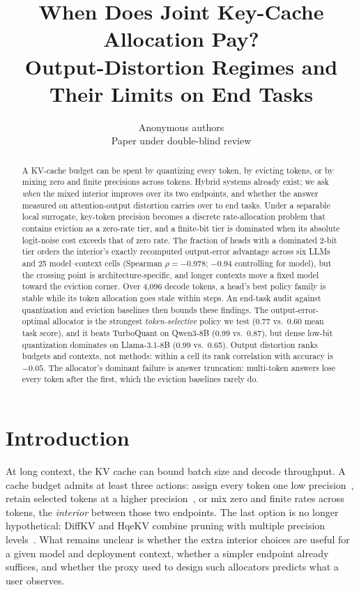 \documentclass{article}
\title{When Does Joint Key-Cache Allocation Pay?\\
Output-Distortion Regimes and Their Limits on End Tasks}
\author{Anonymous authors \\ Paper under double-blind review}
\theoremstyle{definition}
\begin{document}
\maketitle

\begin{abstract}
A KV-cache budget can be spent by quantizing every token, by evicting tokens, or by mixing zero and finite precisions across tokens.  Hybrid systems already exist; we ask \emph{when} the mixed interior improves over its two endpoints, and whether the answer measured on attention-output distortion carries over to end tasks.  Under a separable local surrogate, key-token precision becomes a discrete rate-allocation problem that contains eviction as a zero-rate tier, and a finite-bit tier is dominated when its absolute logit-noise cost exceeds that of zero rate.  The fraction of heads with a dominated 2-bit tier orders the interior's exactly recomputed output-error advantage across six LLMs and 25 model--context cells (Spearman $\rho=-0.978$; $-0.94$ controlling for model), but the crossing point is architecture-specific, and longer contexts move a fixed model toward the eviction corner.  Over 4,096 decode tokens, a head's best policy family is stable while its token allocation goes stale within steps.  An end-task audit against quantization and eviction baselines then bounds these findings.  The output-error-optimal allocator is the strongest \emph{token-selective} policy we test (0.77 vs.\ 0.60 mean task score), and it beats TurboQuant on Qwen3-8B (0.99 vs.\ 0.87), but dense low-bit quantization dominates on Llama-3.1-8B (0.99 vs.\ 0.65).  Output distortion ranks budgets and contexts, not methods: within a cell its rank correlation with accuracy is $-0.05$.  The allocator's dominant failure is answer truncation: multi-token answers lose every token after the first, which the eviction baselines rarely do.
\end{abstract}

\section{Introduction}
\label{sec:intro}

At long context, the KV cache can bound batch size and decode throughput.  A cache budget admits at least three actions: assign every token one low precision~\citep{liu2024kivi,hooper2024kvquant,zandieh2025turboquant}, retain selected tokens at a higher precision~\citep{zhang2023h2o,liu2023scissorhands,li2024snapkv,xiao2024streamingllm}, or mix zero and finite rates across tokens, the \emph{interior} between those two endpoints.  The last option is no longer hypothetical: DiffKV and HqeKV combine pruning with multiple precision levels~\citep{zhang2025diffkv,wang-etal-2026-hqekv}.  What remains unclear is whether the extra interior choices are useful for a given model and deployment context, whether a simpler endpoint already suffices, and whether the proxy used to design such allocators predicts what a user observes.
\end{document}
